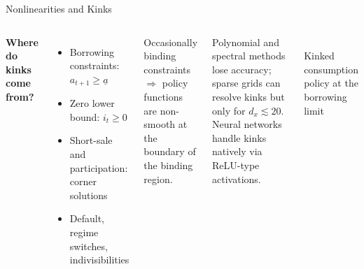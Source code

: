 \documentclass[aspectratio=169,11pt]{beamer}
\newcommand{\emphc}[1]{\textcolor{harvardcrimson}{#1}}
\begin{document}
\begin{frame}{Nonlinearities and Kinks}
\begin{columns}[T]
\textbf{Where do kinks come from?}
\begin{itemize}
    \setlength{\itemsep}{1pt}
    \item \emphc{Borrowing constraints}: $a_{t+1}\ge \underline{a}$
    \item \emphc{Zero lower bound}: $i_t \ge 0$
    \item \emphc{Short-sale and participation}: corner solutions
    \item \emphc{Default, regime switches, indivisibilities}
\end{itemize}

\vspace{0.4em}
Occasionally binding constraints $\Rightarrow$ policy functions are \emphc{non-smooth} at the boundary of the binding region.

\vspace{0.4em}
{\footnotesize Polynomial and spectral methods lose accuracy; sparse grids can resolve kinks but only for $d_x\lesssim 20$. Neural networks handle kinks natively via ReLU-type activations.}

\begin{center}
\\
{\footnotesize Kinked consumption policy at the borrowing limit}
\end{center}
\end{columns}
\end{frame}
\end{document}
